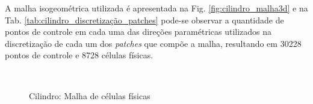 \documentclass[tese_patricia]{subfiles}
\begin{document}
A malha isogeométrica utilizada é apresentada na Fig. \ref{fig:cilindro_malha3d} e na Tab. \ref{tab:cilindro_discretização_patches} pode-se observar a quantidade de pontos de controle em cada uma das direções paramétricas utilizados na discretização de cada um dos \textit{patches} que compõe a malha, resultando em 30228 pontos de controle e 8728 células físicas.


\begin{figure}[!htb]
	\centering
	\\
	\caption{Cilindro: Malha de células físicas}
\end{figure}
\end{document}
